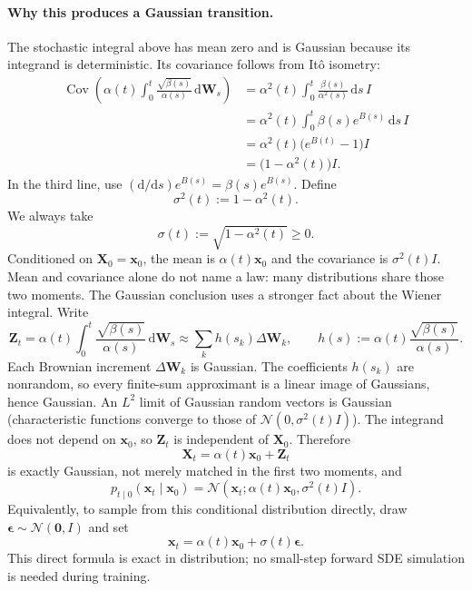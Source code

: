 \documentclass[11pt,a4paper]{article}
\theoremstyle{definition}
\begin{document}
\paragraph{Why this produces a Gaussian transition.}
The stochastic integral above has mean zero and is Gaussian because its integrand is
deterministic. Its covariance follows from It\^o isometry:
\[
\begin{aligned}
\operatorname{Cov}\left(
\alpha(t)\int_0^t
\frac{\sqrt{\beta(s)}}{\alpha(s)}\,\mathrm{d}\mathbf{W}_s
\right)
&=
\alpha^2(t)\int_0^t
\frac{\beta(s)}{\alpha^2(s)}\,\mathrm{d}s\,I\\
&=
\alpha^2(t)\int_0^t
\beta(s)e^{B(s)}\,\mathrm{d}s\,I\\
&=
\alpha^2(t)\bigl(e^{B(t)}-1\bigr)I\\
&=
\bigl(1-\alpha^2(t)\bigr)I.
\end{aligned}
\]
In the third line, use
$(\mathrm{d}/\mathrm{d}s)e^{B(s)}=\beta(s)e^{B(s)}$. Define
\[
\sigma^2(t):=1-\alpha^2(t).
\]
We always take
\[
\sigma(t):=\sqrt{1-\alpha^2(t)}\geq0.
\]
Conditioned on $\mathbf{X}_0=\mathbf{x}_0$, the mean is
$\alpha(t)\mathbf{x}_0$ and the covariance is $\sigma^2(t)I$. Mean and covariance
alone do not name a law: many distributions share those two moments. The Gaussian
conclusion uses a stronger fact about the Wiener integral. Write
\[
\mathbf{Z}_t
=
\alpha(t)\int_0^t
\frac{\sqrt{\beta(s)}}{\alpha(s)}\,\mathrm{d}\mathbf{W}_s
\approx
\sum_k h(s_k)\Delta\mathbf{W}_k,
\qquad
h(s)
:=
\alpha(t)\frac{\sqrt{\beta(s)}}{\alpha(s)}.
\]
Each Brownian increment $\Delta\mathbf{W}_k$ is Gaussian. The coefficients $h(s_k)$
are nonrandom, so every finite-sum approximant is a linear image of Gaussians, hence
Gaussian. An $L^2$ limit of Gaussian random vectors is Gaussian (characteristic
functions converge to those of $\mathcal{N}(0,\sigma^2(t)I)$). The integrand does
not depend on $\mathbf{x}_0$, so $\mathbf{Z}_t$ is independent of
$\mathbf{X}_0$. Therefore
\[
\mathbf{X}_t
=
\alpha(t)\mathbf{x}_0+\mathbf{Z}_t
\]
is exactly Gaussian, not merely matched in the first two moments, and
\[
p_{t\mid 0}(\mathbf{x}_t\mid\mathbf{x}_0)
=\mathcal{N}\left(
\mathbf{x}_t;
\alpha(t)\mathbf{x}_0,
\sigma^2(t)I
\right).
\]
Equivalently, to sample from this conditional distribution directly, draw
$\boldsymbol{\epsilon}\sim\mathcal{N}(\mathbf{0},I)$ and set
\[
\mathbf{x}_t
=\alpha(t)\mathbf{x}_0+\sigma(t)\boldsymbol{\epsilon}.
\]
This direct formula is exact in distribution; no small-step forward SDE simulation is
needed during training.
\end{document}
